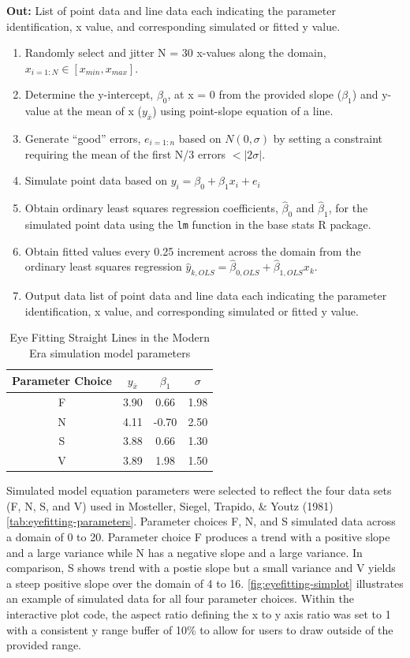 \documentclass[print]{nuthesis}
\providecommand{\tightlist}{%
  \setlength{\itemsep}{0pt}\setlength{\parskip}{0pt}}
\begin{document}
\noindent \textbf{Out:} List of point data and line data each indicating the parameter identification, x value, and corresponding simulated or fitted y value.

\begin{enumerate}
\def\labelenumi{\arabic{enumi}.}
\tightlist
\item
  Randomly select and jitter N = 30 x-values along the domain, \(x_{i=1:N}\in [x_{min}, x_{max}]\).
\item
  Determine the y-intercept, \(\beta_0\), at x = 0 from the provided slope (\(\beta_1\)) and y-value at the mean of x (\(y_{\bar{x}}\)) using point-slope equation of a line.
\item
  Generate ``good'' errors, \(e_{i = 1:n}\) based on \(N(0,\sigma)\) by setting a constraint requiring the mean of the first N/3 errors \(< |2\sigma|.\)
\item
  Simulate point data based on \(y_i = \beta_0 + \beta_1 x_i + e_i\)
\item
  Obtain ordinary least squares regression coefficients, \(\hat\beta_0\) and \(\hat\beta_1\), for the simulated point data using the \texttt{lm} function in the base stats R package.
\item
  Obtain fitted values every 0.25 increment across the domain from the ordinary least squares regression \(\hat y_{k,OLS} = \hat\beta_{0,OLS} + \hat\beta_{1,OLS} x_k\).
\item
  Output data list of point data and line data each indicating the parameter identification, x value, and corresponding simulated or fitted y value.
\end{enumerate}

\begin{table}

\caption{\label{tab:eyefiting-parameters}Eye Fitting Straight Lines in the Modern Era simulation model parameters}
\centering
\begin{tabular}[t]{cccc}
\toprule
Parameter Choice & $y_{\bar{x}}$ & $\beta_1$ & $\sigma$\\
\midrule
F & 3.90 & 0.66 & 1.98\\
N & 4.11 & -0.70 & 2.50\\
S & 3.88 & 0.66 & 1.30\\
V & 3.89 & 1.98 & 1.50\\
\bottomrule
\end{tabular}
\end{table}

Simulated model equation parameters were selected to reflect the four data sets (F, N, S, and V) used in Mosteller, Siegel, Trapido, \& Youtz (1981) \cref{tab:eyefitting-parameters}.
Parameter choices F, N, and S simulated data across a domain of 0 to 20.
Parameter choice F produces a trend with a positive slope and a large variance while N has a negative slope and a large variance.
In comparison, S shows trend with a postie slope but a small variance and V yields a steep positive slope over the domain of 4 to 16.
\cref{fig:eyefitting-simplot} illustrates an example of simulated data for all four parameter choices.
Within the interactive plot code, the aspect ratio defining the x to y axis ratio was set to 1 with a consistent y range buffer of 10\% to allow for users to draw outside of the provided range.
\end{document}
